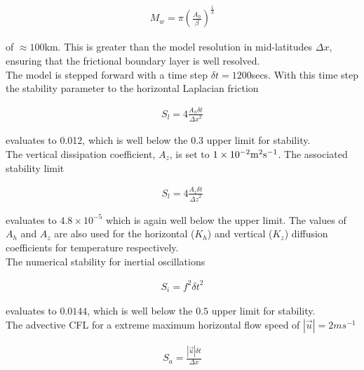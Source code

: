 \begin{eqnarray}
\label{EQ:eg-simple-tracer-munk_layer}
M_{w} = \pi ( \frac { A_{h} }{ \beta } )^{\frac{1}{3}}
\end{eqnarray}

\noindent  of $\approx 100$km. This is greater than the model
resolution in mid-latitudes $\Delta x$, ensuring that the frictional 
boundary layer is well resolved.
\\

\noindent The model is stepped forward with a 
time step $\delta t=1200$secs. With this time step the stability 
parameter to the horizontal Laplacian friction \cite{adcroft:95}

\begin{eqnarray}
\label{EQ:eg-simple-tracer-laplacian_stability}
S_{l} = 4 \frac{A_{h} \delta t}{{\Delta x}^2}
\end{eqnarray}

\noindent evaluates to 0.012, which is well below the 0.3 upper limit
for stability. 
\\

\noindent The vertical dissipation coefficient, $A_{z}$, is set to 
$1\times10^{-2} {\rm m}^2{\rm s}^{-1}$. The associated stability limit

\begin{eqnarray}
\label{EQ:eg-simple-tracer-laplacian_stability_z}
S_{l} = 4 \frac{A_{z} \delta t}{{\Delta z}^2}
\end{eqnarray}

\noindent evaluates to $4.8 \times 10^{-5}$ which is again well below
the upper limit.
The values of $A_{h}$ and $A_{z}$ are also used for the horizontal ($K_{h}$) 
and vertical ($K_{z}$) diffusion coefficients for temperature respectively.
\\

\noindent The numerical stability for inertial oscillations
\cite{adcroft:95} 

\begin{eqnarray}
\label{EQ:eg-simple-tracer-inertial_stability}
S_{i} = f^{2} {\delta t}^2
\end{eqnarray}

\noindent evaluates to $0.0144$, which is well below the $0.5$ upper 
limit for stability.
\\

\noindent The advective CFL \cite{adcroft:95} for a extreme maximum 
horizontal flow
speed of $ | \vec{u} | = 2 ms^{-1}$

\begin{eqnarray}
\label{EQ:eg-simple-tracer-cfl_stability}
S_{a} = \frac{| \vec{u} | \delta t}{ \Delta x}
\end{eqnarray}

